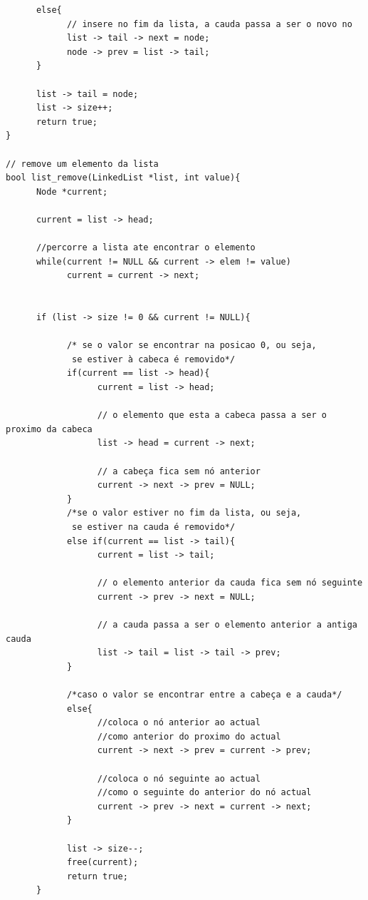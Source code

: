 \begin{verbatim}
      else{
            // insere no fim da lista, a cauda passa a ser o novo no
            list -> tail -> next = node;
            node -> prev = list -> tail;
      }

      list -> tail = node;
      list -> size++;
      return true;
}

// remove um elemento da lista
bool list_remove(LinkedList *list, int value){
      Node *current;

      current = list -> head;

      //percorre a lista ate encontrar o elemento 
      while(current != NULL && current -> elem != value)
            current = current -> next;


      if (list -> size != 0 && current != NULL){

            /* se o valor se encontrar na posicao 0, ou seja,
             se estiver à cabeca é removido*/
            if(current == list -> head){
                  current = list -> head;

                  // o elemento que esta a cabeca passa a ser o proximo da cabeca
                  list -> head = current -> next;
                  
                  // a cabeça fica sem nó anterior
                  current -> next -> prev = NULL; 
            }
            /*se o valor estiver no fim da lista, ou seja,
             se estiver na cauda é removido*/
            else if(current == list -> tail){
                  current = list -> tail;

                  // o elemento anterior da cauda fica sem nó seguinte
                  current -> prev -> next = NULL;
                  
                  // a cauda passa a ser o elemento anterior a antiga cauda
                  list -> tail = list -> tail -> prev;
            }		

            /*caso o valor se encontrar entre a cabeça e a cauda*/
            else{
                  //coloca o nó anterior ao actual
                  //como anterior do proximo do actual
                  current -> next -> prev = current -> prev;

                  //coloca o nó seguinte ao actual 
                  //como o seguinte do anterior do nó actual
                  current -> prev -> next = current -> next;
            }

            list -> size--;
            free(current);
            return true;
      }


\end{verbatim}
